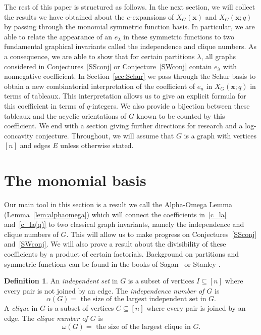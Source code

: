 \documentclass[12pt]{amsart}  %
\theoremstyle{definition}
\newtheorem{definition}[theorem]{Definition}
\theoremstyle{remark}
\numberwithin{equation}{section}
\newcommand{\la}{\lambda}
\begin{document}
The rest of this paper is structured as follows.  In the next section, we will collect the results we have obtained about the $e$-expansions of $X_G(\bm x)$ and $X_G(\bm x;q)$ by passing through the monomial symmetric function basis.  In particular, we are able to relate the appearance of an $e_\la$ in these symmetric functions to two fundamental graphical invariants called the independence and clique numbers.  As a consequence, we are able to show that for certain partitions $\la$,
all graphs considered in Conjectures~\ref{SSconj} or Conjecture~\ref{SWconj} contain $e_\la$ with nonnegative coefficient.  In Section~\ref{sec:Schur} we pass through the Schur basis to obtain a new combinatorial interpretation of the coefficient of $e_n$ in $X_G(\bm x;q)$ in terms of tableaux.  
This interpretation allows us to give an explicit formula for this coefficient in terms of $q$-integers.
We also provide a bijection between these tableaux and the acyclic orientations of $G$ known to be counted by this coefficient.
We end with a section giving further directions for research and a log-concavity conjecture.
Throughout, we will assume that $G$ is a graph with vertices $[n]$ and edges $E$ unless otherwise stated.

\section{The monomial basis}\label{sec:alphaomega}

Our main tool in this section is a result we call the Alpha-Omega Lemma (Lemma~\ref{lem:alphaomega}) which 
will connect the coefficients in~\eqref{c_la} and~\eqref{c_la(q)} to two classical graph invariants, namely the independence and clique numbers of $G$.
This will allow us to make progress on Conjectures~\ref{SSconj} and~\ref{SWconj}.
We will also prove a result about the divisibility of these coefficients by a product of certain factorials. Background on partitions and symmetric functions can be found in the books of Sagan~\cite{symgroup} or Stanley \cite{enum2}. 



\begin{definition}
An \emph{independent set} in $G$ is a subset of vertices $I\subseteq [n]$ where every pair is not joined by an edge. The \emph{independence number of $G$} is 
$$
\alpha(G) = \text{ the size of the largest independent set in $G$.}
$$
A \emph{clique} in $G$ is a subset of vertices $C\subseteq [n]$ where every pair is joined by an edge. 
The \emph{clique number of $G$} is
$$
\omega(G) = \text{ the size of the largest clique in $G$.}
$$
\end{definition}
\end{document}
